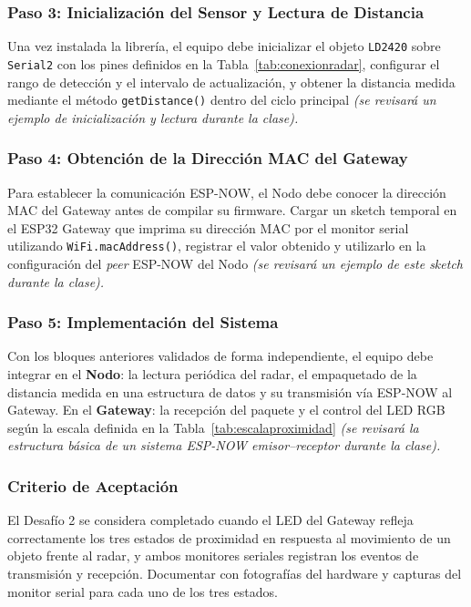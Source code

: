\documentclass[12pt,leqno]{article}
\begin{document}
\pagebreak
\subsubsection*{Paso 3: Inicializaci\'on del Sensor y Lectura de Distancia}

Una vez instalada la librer\'ia, el equipo debe inicializar el objeto \texttt{LD2420}
sobre \texttt{Serial2} con los pines definidos en la Tabla~\ref{tab:conexionradar},
configurar el rango de detecci\'on y el intervalo de actualizaci\'on, y obtener la
distancia medida mediante el m\'etodo \texttt{getDistance()} dentro del ciclo
principal \textit{(se revisar\'a un ejemplo de inicializaci\'on y lectura durante
la clase).}

\subsubsection*{Paso 4: Obtenci\'on de la Direcci\'on MAC del Gateway}

Para establecer la comunicaci\'on ESP-NOW, el Nodo debe conocer la direcci\'on MAC
del Gateway antes de compilar su firmware. Cargar un sketch temporal en el ESP32
Gateway que imprima su direcci\'on MAC por el monitor serial utilizando
\texttt{WiFi.macAddress()}, registrar el valor obtenido y utilizarlo en la
configuraci\'on del \textit{peer} ESP-NOW del Nodo \textit{(se revisar\'a un
ejemplo de este sketch durante la clase).}

\subsubsection*{Paso 5: Implementaci\'on del Sistema}

Con los bloques anteriores validados de forma independiente, el equipo debe integrar
en el \textbf{Nodo}: la lectura peri\'odica del radar, el empaquetado de la distancia
medida en una estructura de datos y su transmisi\'on v\'ia ESP-NOW al Gateway. En el
\textbf{Gateway}: la recepci\'on del paquete y el control del LED RGB seg\'un la
escala definida en la Tabla~\ref{tab:escalaproximidad} \textit{(se revisar\'a la
estructura b\'asica de un sistema ESP-NOW emisor--receptor durante la clase).}

\subsubsection*{Criterio de Aceptaci\'on}

El Desaf\'io 2 se considera completado cuando el LED del Gateway refleja correctamente
los tres estados de proximidad en respuesta al movimiento de un objeto frente al
radar, y ambos monitores seriales registran los eventos de transmisi\'on y recepci\'on.
Documentar con fotograf\'ias del hardware y capturas del monitor serial para cada uno
de los tres estados.
\end{document}
